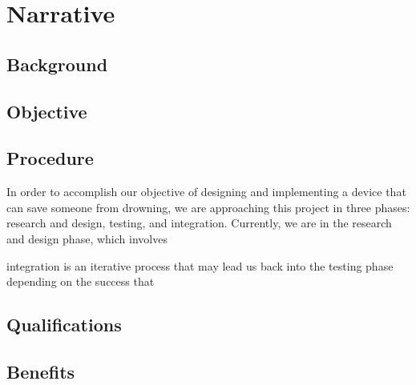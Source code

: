 \documentclass[11pt]{article}
\begin{document}
\section*{Narrative}

\subsection*{Background}

\subsection*{Objective}

\subsection*{Procedure}

In order to accomplish our objective of designing and implementing a device that can save someone from drowning, we are approaching this project in three phases: research and design, testing, and integration. Currently, we are in the research and design phase, which involves 


integration is an iterative process that may lead us back into the testing phase depending on the success that 

\subsection*{Qualifications}

\subsection*{Benefits}
\end{document}
